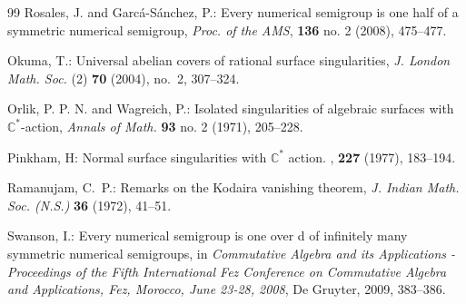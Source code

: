 \documentclass[12pt,a4paper]{amsart}
\theoremstyle{remark}
\theoremstyle{definition}
\begin{document}
\begin{thebibliography}{99}
 Rosales, J. and Garc\'a-S\'anchez, P.: Every numerical semigroup is one half of a symmetric numerical semigroup, {\em Proc. of the AMS}, {\bf 136} no. 2 (2008), 475--477.

Okuma, T.: Universal abelian covers of rational surface singularities, {\em J. London Math. Soc.} (2) \textbf{70} (2004), no.~2, 307--324.

Orlik, P. P. N. and Wagreich, P.: Isolated singularities of algebraic surfaces with $\mathbb{C}^*$-action, {\em Annals of Math.} {\bf 93} no. 2 (1971), 205--228. 
  
Pinkham, H:
\newblock Normal surface singularities with $\mathbb{C}^*$ action.
, {\bf 227} (1977), 183--194.

Ramanujam, C.~P.: Remarks on the {K}odaira vanishing theorem, \emph{J. Indian Math. Soc. (N.S.)} \textbf{36} (1972), 41--51.

 Swanson, I.: Every numerical semigroup is one over d of infinitely many symmetric numerical semigroups, in {\em Commutative Algebra and its Applications - Proceedings of the Fifth International Fez Conference on Commutative Algebra and Applications, Fez, Morocco, June 23-28, 2008}, De Gruyter, 2009, 383--386.


\end{thebibliography}
\end{document}
